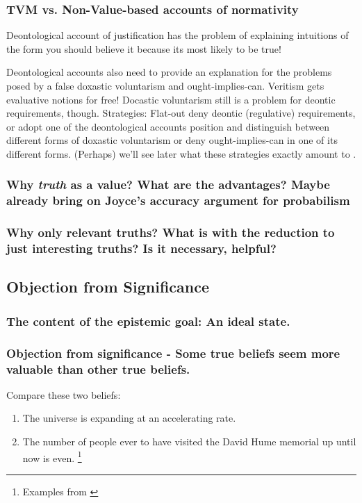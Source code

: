 \documentclass[12pt,numbers=noenddot]{scrartcl}
\begin{document}
    \subsubsection{ TVM vs. Non-Value-based accounts of normativity }
    Deontological account of justification has the problem of explaining intuitions of the form you should believe it because its most likely to be true!

    Deontological accounts also need to provide an explanation for the problems posed by a false doxastic voluntarism and ought-implies-can. Veritism gets evaluative notions for free! Docastic voluntarism still is a problem for deontic requirements, though. Strategies: Flat-out deny deontic (regulative) requirements, or adopt one of the deontological accounts position and distinguish between different forms of doxastic voluntarism or deny ought-implies-can in one of its different forms. (Perhaps) we'll see later what these strategies exactly amount to .
    \subsubsection{ Why \emph{truth} as a value? What are the advantages? Maybe already bring on Joyce's accuracy argument for probabilism }


    \subsubsection{ Why only relevant truths? What is with the reduction to just interesting truths? Is it necessary, helpful? }

\subsection{Objection from Significance}
    \subsubsection{ The content of the epistemic goal: An ideal state.}
    \subsubsection{ Objection from significance - Some true beliefs seem more valuable than other true beliefs.}

    Compare these two beliefs:
    \begin{enumerate}
        \item The universe is expanding at an accelerating rate.
        \item The number of people ever to have visited the David Hume memorial up until now is even. \footnote{Examples from \textcite{Ahlstrom-Vij2013}}
    \end{enumerate}
\end{document}
